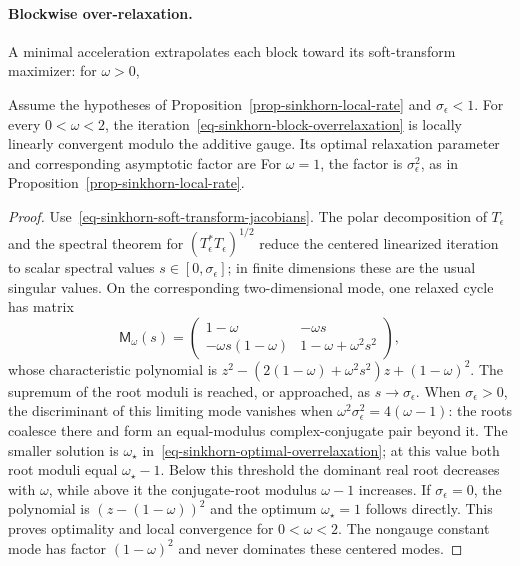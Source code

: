 \paragraph{Blockwise over-relaxation.}
A minimal acceleration extrapolates each block toward its soft-transform maximizer: for $\omega>0$,
\begin{prop}\label{prop-sinkhorn-optimal-overrelaxation}
Assume the hypotheses of Proposition~\ref{prop-sinkhorn-local-rate} and $\sigma_\epsilon<1$. For every $0<\omega<2$, the iteration~\eqref{eq-sinkhorn-block-overrelaxation} is locally linearly convergent modulo the additive gauge. Its optimal relaxation parameter and corresponding asymptotic factor are
For $\omega=1$, the factor is $\sigma_\epsilon^2$, as in Proposition~\ref{prop-sinkhorn-local-rate}.
\end{prop}
\begin{proof}
Use~\eqref{eq-sinkhorn-soft-transform-jacobians}. The polar decomposition of $T_\epsilon$ and the spectral theorem for $(T_\epsilon^*T_\epsilon)^{1/2}$ reduce the centered linearized iteration to scalar spectral values $s\in[0,\sigma_\epsilon]$; in finite dimensions these are the usual singular values. On the corresponding two-dimensional mode, one relaxed cycle has matrix
\[
\mathsf M_\omega(s)
=
\begin{pmatrix}
1-\omega&-\omega s\\
-\omega s(1-\omega)&1-\omega+\omega^2s^2
\end{pmatrix},
\]
whose characteristic polynomial is $z^2-(2(1-\omega)+\omega^2s^2)z+(1-\omega)^2$.
The supremum of the root moduli is reached, or approached, as $s\to\sigma_\epsilon$. When $\sigma_\epsilon>0$, the discriminant of this limiting mode vanishes when
\(\omega^2\sigma_\epsilon^2=4(\omega-1)\):
the roots coalesce there and form an equal-modulus complex-conjugate pair beyond it. The smaller solution is $\omega_\star$ in~\eqref{eq-sinkhorn-optimal-overrelaxation}; at this value both root moduli equal $\omega_\star-1$. Below this threshold the dominant real root decreases with $\omega$, while above it the conjugate-root modulus $\omega-1$ increases. If $\sigma_\epsilon=0$, the polynomial is $(z-(1-\omega))^2$ and the optimum $\omega_\star=1$ follows directly. This proves optimality and local convergence for $0<\omega<2$.
The nongauge constant mode has factor $(1-\omega)^2$ and never dominates these centered modes.
\end{proof}
